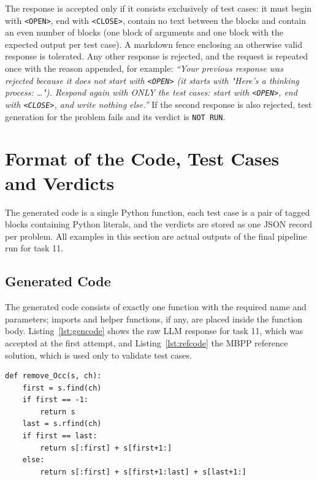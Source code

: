 \documentclass[11pt, a4paper]{article}
\begin{document}
The response is accepted only if it consists exclusively of test cases: it must begin with \texttt{<OPEN>}, end with \texttt{<CLOSE>}, contain no text between the blocks and contain an even number of blocks (one block of arguments and one block with the expected output per test case). A markdown fence enclosing an otherwise valid response is tolerated. Any other response is rejected, and the request is repeated once with the reason appended, for example: \emph{``Your previous response was rejected because it does not start with \texttt{<OPEN>} (it starts with "Here's a thinking process: \ldots"). Respond again with ONLY the test cases: start with \texttt{<OPEN>}, end with \texttt{<CLOSE>}, and write nothing else.''} If the second response is also rejected, test generation for the problem fails and its verdict is \texttt{NOT RUN}.

\section{Format of the Code, Test Cases and Verdicts}
\label{sec:formats}

The generated code is a single Python function, each test case is a pair of tagged blocks containing Python literals, and the verdicts are stored as one JSON record per problem. All examples in this section are actual outputs of the final pipeline run for task 11.

\subsection{Generated Code}
\label{sec:codeformat}

The generated code consists of exactly one function with the required name and parameters; imports and helper functions, if any, are placed inside the function body. Listing~\ref{lst:gencode} shows the raw LLM response for task 11, which was accepted at the first attempt, and Listing~\ref{lst:refcode} the MBPP reference solution, which is used only to validate test cases.

\begin{lstlisting}[style=python, caption={Generated code for task 11 (\texttt{generated\_code.py})}, label={lst:gencode}]
def remove_Occ(s, ch):
    first = s.find(ch)
    if first == -1:
        return s
    last = s.rfind(ch)
    if first == last:
        return s[:first] + s[first+1:]
    else:
        return s[:first] + s[first+1:last] + s[last+1:]
\end{lstlisting}
\end{document}
